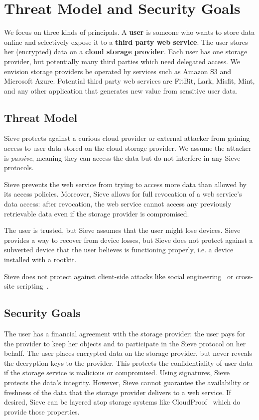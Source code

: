 \chapter{Threat Model and Security Goals}
\label{sec:threatModel}

We focus on three kinds of principals. A
\textbf{user} is someone who wants to store
data online and selectively expose it
to a \textbf{third party web service}. The
user stores her (encrypted) data on a
\textbf{cloud storage provider}. Each
user has one storage provider, but
potentially many third parties which
need delegated access. We envision storage
providers be operated by services 
such as Amazon S3 and Microsoft
Azure. Potential third party web services
are FitBit, Lark, Misfit, Mint, and 
any other application that generates new value
from sensitive user data.

\section{Threat Model}
Sieve protects against a curious cloud
provider or external attacker from
gaining access to user data stored
on the cloud storage provider. We assume
the attacker is \textit{passive}, meaning
they can access the data but do not interfere
in any Sieve protocols. 

Sieve prevents the web service from trying
to access more data than allowed by its
access policies. Moreover, Sieve allows for full revocation
of a web service's data access:
after revocation, the web service cannot
access any previously retrievable data
even if the storage provider is compromised.

The user is trusted, but Sieve assumes that
the user might lose devices. Sieve
provides a way to recover from device 
losses, but Sieve does not protect against
a subverted device that the user believes 
is functioning properly, i.e. a device
installed with a rootkit.

Sieve does not protect against client-side
attacks like social engineering~\cite{socialEngineering}
or cross-site scripting~\cite{xss}.

\section{Security Goals}
The user has a financial agreement with
the storage provider: the user pays for the provider 
to keep her objects and to participate in the
Sieve protocol on her behalf.
The user places encrypted data on the
storage provider, but never reveals
the decryption keys to the provider. 
This protects the confidentiality of
user data if the storage service is
malicious or compromised. Using signatures,
Sieve protects the data's
integrity. However, Sieve cannot
guarantee the availability or freshness
of the data that the storage provider
delivers to a web service. If desired,
Sieve can be layered atop storage
systems like CloudProof~\cite{cloudproof}
which do provide those properties.

